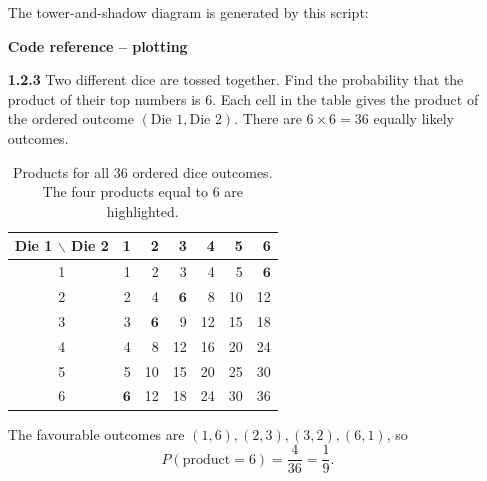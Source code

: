 \begin{enumerate}[label={},leftmargin=0pt,itemsep=9pt]
The tower-and-shadow diagram is generated by this script:
\par\smallskip
\noindent\textbf{Code reference -- plotting}
\par\noindent{}
\par\smallskip
\newpage
\setcounter{qcurrent}{3}\setcounter{equation}{0}
\item[\textbf{1.2.3}] Two different dice are tossed together. Find the probability that the product of their top numbers is $6$.
\solution Each cell in the table gives the product of the ordered outcome $(\text{Die 1},\text{Die 2})$. There are $6\times6=36$ equally likely outcomes.
\begin{table}[H]\centering\small
\caption{Products for all 36 ordered dice outcomes. The four products equal to 6 are highlighted.}
\setlength{\tabcolsep}{5pt}
\begin{tabular}{c|rrrrrr}
\hline
Die 1 $\backslash$ Die 2 & 1 & 2 & 3 & 4 & 5 & 6\\\hline
1 & 1 & 2 & 3 & 4 & 5 & $\mathbf{6}$\\
2 & 2 & 4 & $\mathbf{6}$ & 8 & 10 & 12\\
3 & 3 & $\mathbf{6}$ & 9 & 12 & 15 & 18\\
4 & 4 & 8 & 12 & 16 & 20 & 24\\
5 & 5 & 10 & 15 & 20 & 25 & 30\\
6 & $\mathbf{6}$ & 12 & 18 & 24 & 30 & 36\\
\hline
\end{tabular}\end{table}
The favourable outcomes are $(1,6),(2,3),(3,2),(6,1)$, so
\begin{equation}
P(\text{product}=6)=\frac4{36}=\frac19.
\end{equation}




\end{enumerate}
